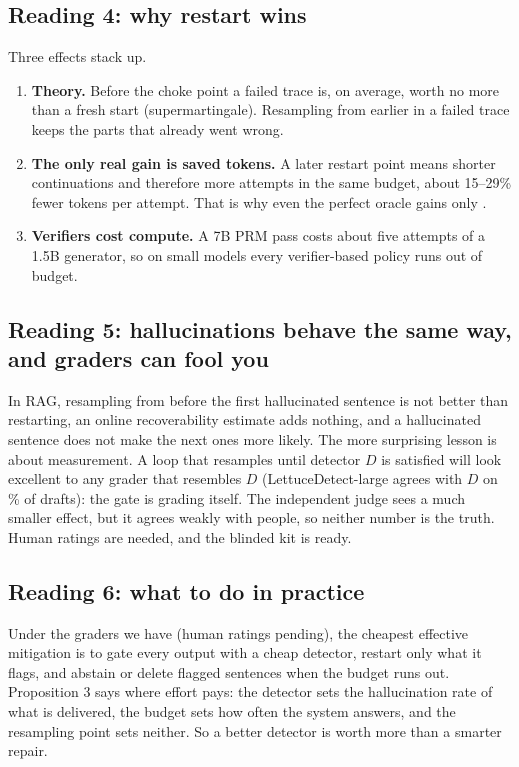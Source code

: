 \documentclass[11pt,a4paper]{article}
\begin{document}
\subsection{Reading 4: why restart wins}
Three effects stack up.
\begin{enumerate}
\item \textbf{Theory.} Before the choke point a failed trace is, on average, worth no more than a fresh
start (supermartingale). Resampling from earlier in a failed trace keeps the parts that
already went wrong.
\item \textbf{The only real gain is saved tokens.} A later restart point means shorter continuations
and therefore more attempts in the same budget, about 15--29\% fewer tokens per attempt. That is
why even the perfect oracle gains only \cbOracleGainB.
\item \textbf{Verifiers cost compute.} A 7B PRM pass costs about five attempts of a 1.5B generator, so on
small models every verifier-based policy runs out of budget.
\end{enumerate}

\subsection{Reading 5: hallucinations behave the same way, and graders can fool you}
In RAG, resampling from before the first hallucinated sentence is not better than restarting, an
online recoverability estimate adds nothing, and a hallucinated sentence does not make the next ones
more likely. The more surprising lesson is about measurement. A loop that resamples until detector
$D$ is satisfied will look excellent to any grader that resembles $D$ (LettuceDetect-large agrees with
$D$ on \robAgreeETwoD\% of drafts): the gate is grading itself. The independent judge sees a much
smaller effect, but it agrees weakly with people, so neither number is the truth. Human ratings are
needed, and the blinded kit is ready.

\subsection{Reading 6: what to do in practice}
Under the graders we have (human ratings pending), the cheapest effective mitigation is to gate every output with a cheap detector, restart only what it
flags, and abstain or delete flagged sentences when the budget runs out. Proposition 3 says where
effort pays: the detector sets the hallucination rate of what is delivered, the budget sets how often
the system answers, and the resampling point sets neither. So a better detector is worth more than a
smarter repair.
\end{document}
